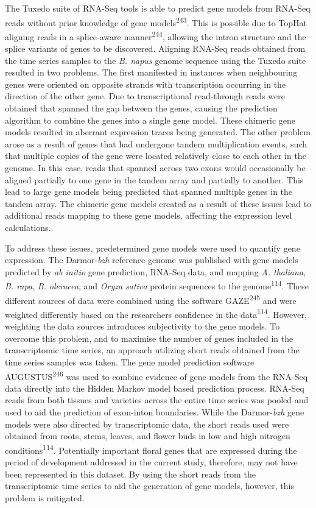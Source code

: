 \documentclass[12pt,]{book}
\begin{document}
The Tuxedo suite of RNA-Seq tools is able to predict gene models from
RNA-Seq reads without prior knowledge of gene
models\textsuperscript{243}. This is possible due to TopHat aligning
reads in a splice-aware manner\textsuperscript{244}, allowing the intron
structure and the splice variants of genes to be discovered. Aligning
RNA-Seq reads obtained from the time series samples to the \emph{B.
napus} genome sequence using the Tuxedo suite resulted in two problems.
The first manifested in instances when neighbouring genes were oriented
on opposite strands with transcription occurring in the direction of the
other gene. Due to transcriptional read-through reads were obtained that
spanned the gap between the genes, causing the prediction algorithm to
combine the genes into a single gene model. These chimeric gene models
resulted in aberrant expression traces being generated. The other
problem arose as a result of genes that had undergone tandem
multiplication events, such that multiple copies of the gene were
located relatively close to each other in the genome. In this case,
reads that spanned across two exons would occasionally be aligned
partially to one gene in the tandem array and partially to another. This
lead to large gene models being predicted that spanned multiple genes in
the tandem array. The chimeric gene models created as a result of these
issues lead to additional reads mapping to these gene models, affecting
the expression level calculations.

To address these issues, predetermined gene models were used to quantify
gene expression. The Darmor-\emph{bzh} reference genome was published
with gene models predicted by \emph{ab initio} gene prediction, RNA-Seq
data, and mapping \emph{A. thaliana}, \emph{B. rapa}, \emph{B.
oleracea}, and \emph{Oryza sativa} protein sequences to the
genome\textsuperscript{114}. These different sources of data were
combined using the software GAZE\textsuperscript{245} and were weighted
differently based on the researchers confidence in the
data\textsuperscript{114}. However, weighting the data sources
introduces subjectivity to the gene models. To overcome this problem,
and to maximise the number of genes included in the transcriptomic time
series, an approach utilizing short reads obtained from the time series
samples was taken. The gene model prediction software
AUGUSTUS\textsuperscript{246} was used to combine evidence of gene
models from the RNA-Seq data directly into the Hidden Markov model based
prediction process. RNA-Seq reads from both tissues and varieties across
the entire time series was pooled and used to aid the prediction of
exon-inton boundaries. While the Darmor-\emph{bzh} gene models were also
directed by transcriptomic data, the short reads used were obtained from
roots, stems, leaves, and flower buds in low and high nitrogen
conditions\textsuperscript{114}. Potentially important floral genes that
are expressed during the period of development addressed in the current
study, therefore, may not have been represented in this dataset. By
using the short reads from the transcriptomic time series to aid the
generation of gene models, however, this problem is mitigated.
\end{document}
